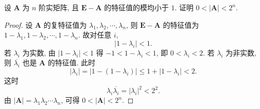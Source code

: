 \documentclass[../../main.tex]{subfiles}
\begin{document}
\begin{example}
设 $\boldsymbol{A}$ 为 $n$ 阶实矩阵, 且 $\boldsymbol{E} - \boldsymbol{A}$ 的特征值的模均小于 $1$. 证明 $0 < |\boldsymbol{A}| < 2^n$.
\end{example}
\begin{proof}
设 $\boldsymbol{A}$ 的复特征值为 $\lambda_1, \lambda_2, \cdots, \lambda_n$, 则 $\boldsymbol{E} - \boldsymbol{A}$ 的特征值为 $1 - \lambda_1, 1 - \lambda_2, \cdots, 1 - \lambda_n$. 故对任意 $i$,
\[
|1 - \lambda_i| < 1.
\]
若 $\lambda_i$ 为实数, 由 $|1 - \lambda_i| < 1$ 得 $-1 < 1 - \lambda_i < 1$, 即 $0 < \lambda_i < 2$.
若 $\lambda_i$ 为非实数, 则 $\overline{\lambda_i}$ 也是 $\boldsymbol{A}$ 的特征值. 此时
\[
|\lambda_i| = |1 - (1 - \lambda_i)| \leqslant 1 + |1 - \lambda_i| < 2.
\]
这时
\[
\lambda_i \overline{\lambda_i} = |\lambda_i|^2 < 2^2.
\]
由 $|\boldsymbol{A}| = \lambda_1 \lambda_2 \cdots \lambda_n$, 可得 $0 < |\boldsymbol{A}| < 2^n$.

\end{proof}
\end{document}
